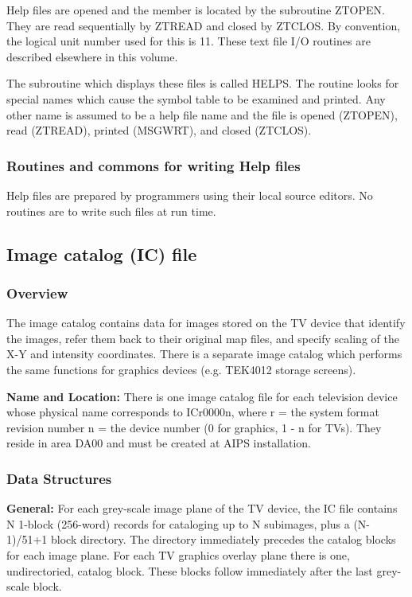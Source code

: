      Help files are opened and the member is located by the subroutine
ZTOPEN.  They are read sequentially by ZTREAD and closed by
ZTCLOS.  By convention, the logical unit number used for this is 11.
These text file I/O routines are described elsewhere in this volume.

     The subroutine which displays these files is called HELPS.  The
routine looks for special names which cause the symbol table to be
examined and printed.  Any other name is assumed to be a help file name
and the file is opened (ZTOPEN), read (ZTREAD), printed (MSGWRT), and
closed (ZTCLOS).


\subsubsection{Routines and commons for writing Help files}


     Help files are prepared by programmers using their local source
editors.  No routines are to write such files at run time.

\subsection{Image catalog (IC) file}
\subsubsection{ Overview}

  The image catalog contains data for images stored on
the TV device that identify the images, refer them back to
their original map files, and specify scaling of the X-Y and
intensity coordinates.  There is a separate image catalog which
performs the same functions for graphics devices (e.g. TEK4012
storage screens).

{\bf Name and Location:}  There is one image catalog file for each
television device whose physical name corresponds to ICr0000n,
where r = the system format revision number n = the device number (0
for graphics, 1 - n for TVs).
They reside in area DA00 and must be created at AIPS installation.

\subsubsection{ Data Structures}

   {\bf General:} For each grey-scale image plane of the TV device,
the IC file contains N 1-block (256-word) records for cataloging up to
N subimages, plus a (N-1)/51+1 block directory.  The directory
immediately precedes the catalog blocks for each image plane.  For
each TV graphics overlay plane there is one, undirectoried, catalog
block.  These blocks follow immediately after the last grey-scale
block.

